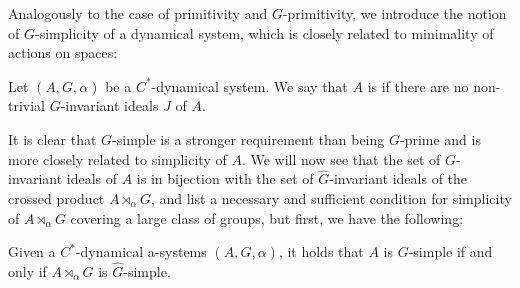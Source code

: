 Analogously to the case of primitivity and $G$-primitivity, we introduce the notion of $G$-simplicity of a dynamical system, which is closely related to minimality of actions on spaces:
\begin{definition}
	Let $(A,G,\alpha)$ be a $C^*$-dynamical system. We say that $A$ is  if there are no non-trivial $G$-invariant ideals $J$ of $A$.
\end{definition}
It is clear that $G$-simple is a stronger requirement than being $G$-prime and is more closely related to simplicity of $A$. We will now see that the set of $G$-invariant ideals of $A$ is in bijection with the set of $\hat G$-invariant ideals of the crossed product $A \rtimes_\alpha G$, and list a necessary and sufficient condition for simplicity of $A \rtimes_\alpha G$ covering a large class of groups, but first, we have the following:
\begin{proposition}
	Given a $C^*$-dynamical a-systems $(A,G,\alpha)$, it holds that $A$ is $G$-simple if and only if $A \rtimes_\alpha G$ is $\hat G$-simple.
	\label{olpe1.6.1}
\end{proposition}
